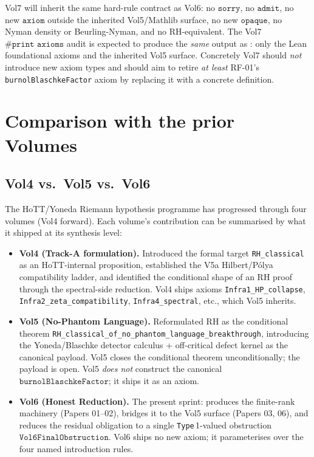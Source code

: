 \documentclass[11pt]{article}
\theoremstyle{plain}
\theoremstyle{definition}
\theoremstyle{remark}
\newcommand{\code}[1]{\texttt{#1}}
\begin{document}
Vol7 will inherit the same hard-rule contract as Vol6: no
\(\code{sorry}\), no \(\code{admit}\), no new
\(\code{axiom}\) outside the inherited Vol5/Mathlib surface, no new
\(\code{opaque}\), no Nyman density or Beurling-Nyman, and no
RH-equivalent.  The Vol7 \(\code{\#print axioms}\) audit is
expected to produce the \emph{same} output as
: only the Lean foundational axioms and
the inherited Vol5 surface.  Concretely Vol7 should \emph{not}
introduce new axiom types and should aim to retire \emph{at least}
RF-01's \code{burnolBlaschkeFactor} axiom by replacing it with a
concrete definition.

\section{Comparison with the prior Volumes}
\label{sec:vol-comparison}

\subsection{Vol4 vs.\ Vol5 vs.\ Vol6}

The HoTT/Yoneda Riemann hypothesis programme has progressed through
four volumes (Vol4 forward).  Each volume's contribution can be
summarised by what it shipped at its synthesis level:

\begin{itemize}[leftmargin=2em]
  \item \textbf{Vol4 (Track-A formulation).}  Introduced the
        formal target \code{RH\_classical} as an HoTT-internal
        proposition, established the V5a Hilbert/Pólya
        compatibility ladder, and identified the conditional shape
        of an RH proof through the spectral-side reduction.  Vol4
        ships axioms \code{Infra1\_HP\_collapse},
        \code{Infra2\_zeta\_compatibility},
        \code{Infra4\_spectral}, etc., which Vol5 inherits.
  \item \textbf{Vol5 (No-Phantom Language).}  Reformulated RH as
        the conditional theorem
        \code{RH\_classical\_of\_no\_phantom\_language\_breakthrough},
        introducing the Yoneda/Blaschke detector calculus +
        off-critical defect kernel as the canonical payload.
        Vol5 closes the conditional theorem unconditionally; the
        payload is open.  Vol5 \emph{does not} construct the
        canonical \(\code{burnolBlaschkeFactor}\); it ships it as
        an axiom.
  \item \textbf{Vol6 (Honest Reduction).}  The present sprint:
        produces the finite-rank machinery (Papers 01--02), bridges
        it to the Vol5 surface (Papers 03, 06), and reduces the
        residual obligation to a single \code{Type}\,1-valued
        obstruction \(\code{Vol6FinalObstruction}\).  Vol6 ships no
        new axiom; it parameterises over the four named
        introduction rules.
\end{itemize}
\end{document}
